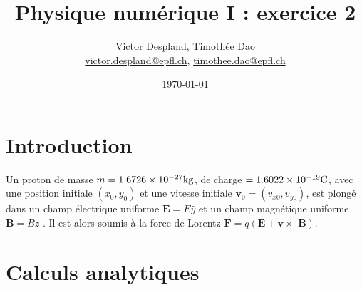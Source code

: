 \documentclass[12pt,twoside]{article}
\newcommand{\mail}[1]{{\href{mailto:#1}{#1}}}
\begin{document}
\title{Physique numérique I : exercice 2}
\date{\today}
\author{Victor Despland, Timothée Dao\\{\small \mail{victor.despland@epfl.ch}, \mail{timothee.dao@epfl.ch}}}
\maketitle
\tableofcontents
\section{Introduction}

Un proton de masse $m = 1.6726  \times 10^{-27 } \rm kg$, de charge $ = 1.6022 \times 10^{-19} \rm C$, avec une position initiale $(x_0, y_0 )$ et une vitesse initiale $\textbf{v}_0 = (v_{x0} , v_{y0} )$, est plongé dans un champ électrique uniforme $\textbf{E} = E\hat{y}$ et un champ magnétique uniforme $\textbf{B} = B\hat{z} $ . Il est alors soumis à la force de Lorentz $\textbf{F} = q(\textbf{E} + \textbf{v} \times\textbf{ B})$.

\section{Calculs analytiques}
\end{document}
